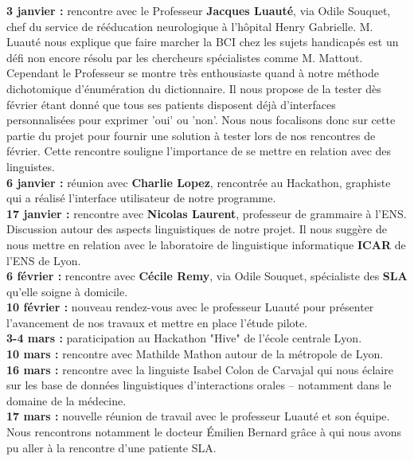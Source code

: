 \documentclass[11pt,a4paper]{article}
\theoremstyle{plain}
\theoremstyle{definition}
\begin{document}
\textbf{3 janvier : } rencontre avec le Professeur \textbf{Jacques Luauté}, via Odile Souquet, chef du service de rééducation neurologique à l'hôpital Henry Gabrielle. M. Luauté nous explique que faire marcher la BCI chez les sujets handicapés est un défi non encore résolu par les chercheurs spécialistes comme M. Mattout. Cependant le Professeur se montre très enthousiaste quand à notre méthode dichotomique d'énumération du dictionnaire. Il nous propose de la tester dès février étant donné que tous ses patients disposent déjà d'interfaces personnalisées pour exprimer 'oui' ou 'non'. Nous nous focalisons donc sur cette partie du projet pour fournir une solution à tester lors de nos rencontres de février. Cette rencontre souligne l'importance de se mettre en relation avec des linguistes. \\

\textbf{6 janvier : } réunion avec \textbf{Charlie Lopez}, rencontrée au Hackathon, graphiste qui a réalisé l'interface utilisateur de notre programme. \\

\textbf{17 janvier : } rencontre avec \textbf{Nicolas Laurent}, professeur de grammaire à l'ENS. Discussion autour des aspects linguistiques de notre projet. Il nous suggère de nous mettre en relation avec le laboratoire de linguistique informatique \textbf{ICAR} de l'ENS de Lyon. \\

\textbf{6 février : } rencontre avec \textbf{Cécile Remy}, via Odile Souquet, spécialiste des \textbf{SLA} qu'elle soigne à domicile. \\

\textbf{10 février : } nouveau rendez-vous avec le professeur Luauté pour présenter l'avancement de nos travaux et mettre en place l'étude pilote. \\

\textbf{3-4 mars : } paraticipation au Hackathon "Hive" de l'école centrale Lyon. \\

\textbf{10 mars : } rencontre avec Mathilde Mathon autour de la métropole de Lyon. \\

\textbf{16 mars : } rencontre avec la linguiste Isabel Colon de Carvajal qui nous éclaire sur les base de données linguistiques d'interactions orales -- notamment dans le domaine de la médecine. \\

\textbf{17 mars : } nouvelle réunion de travail avec le professeur Luauté et son équipe. Nous rencontrons notamment le docteur Émilien Bernard grâce à qui nous avons pu aller à la rencontre d'une patiente SLA. \\
\end{document}
